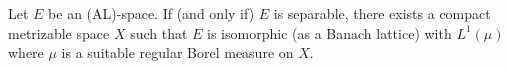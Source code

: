 Let $E$ be an (AL)-space. If (and only if) $E$ is separable, there exists a compact metrizable space $X$ such that $E$ is isomorphic (as a Banach lattice) with $L^1(\mu)$ where $\mu$ is a suitable regular Borel measure on $X$.
